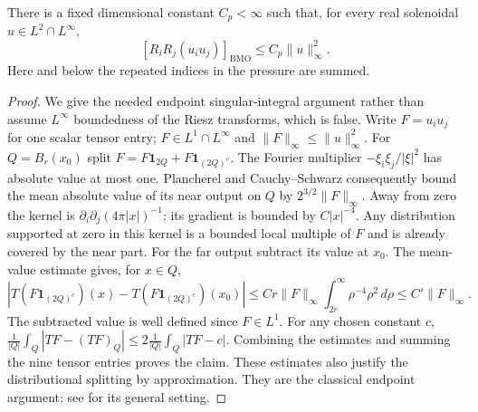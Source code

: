 \begin{lemma}
\label{pc:bmo}
There is a fixed dimensional constant $C_p<\infty$ such that, for every
real solenoidal $u\in L^2\cap L^\infty$,
\[
 [R_iR_j(u_i u_j)]_{\mathrm{BMO}}\le C_p\|u\|_\infty^2.
\]
Here and below the repeated indices in the pressure are summed.
\end{lemma}
\begin{proof}
We give the needed endpoint singular-integral argument rather than assume
$L^\infty$ boundedness of the Riesz transforms, which is false. Write
$F=u_i u_j$ for one scalar tensor entry; $F\in L^1\cap L^\infty$ and
$\|F\|_\infty\le\|u\|_\infty^2$. For $Q=B_r(x_0)$ split
$F=F\mathbf1_{2Q}+F\mathbf1_{(2Q)^c}$. The Fourier multiplier
$-\xi_i\xi_j/|\xi|^2$ has absolute value at most one. Plancherel and
Cauchy--Schwarz consequently bound the mean absolute value of its near
output on $Q$ by $2^{3/2}\|F\|_\infty$.
Away from zero the kernel is $\partial_i\partial_j(4\pi|x|)^{-1}$;
its gradient is bounded by $C|x|^{-4}$. Any distribution supported at zero
in this kernel is a bounded local multiple of $F$ and is already covered
by the near part. For the far output subtract its value at $x_0$.
The mean-value estimate gives, for $x\in Q$,
\[
 |T(F\mathbf1_{(2Q)^c})(x)-T(F\mathbf1_{(2Q)^c})(x_0)|
 \le Cr\|F\|_\infty\int_{2r}^\infty \rho^{-4}\rho^2\,d\rho
 \le C'\|F\|_\infty.
\]
The subtracted value is well defined since $F\in L^1$. For any chosen
constant $c$, $\frac{1}{|Q|}\int_Q|TF-(TF)_Q|\le2\frac{1}{|Q|}\int_Q|TF-c|$.
Combining the estimates and summing the nine tensor entries proves the
claim. These estimates also justify the distributional splitting by
approximation. They are the classical endpoint argument; see
\cite{Stein1970} for its general setting.
\end{proof}

